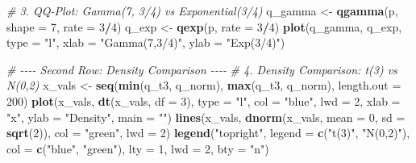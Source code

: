\documentclass[
]{article}
\newenvironment{Shaded}{\begin{snugshade}}{\end{snugshade}}
\newcommand{\AttributeTok}[1]{\textcolor[rgb]{0.13,0.29,0.53}{#1}}
\newcommand{\CommentTok}[1]{\textcolor[rgb]{0.56,0.35,0.01}{\textit{#1}}}
\newcommand{\DecValTok}[1]{\textcolor[rgb]{0.00,0.00,0.81}{#1}}
\newcommand{\FunctionTok}[1]{\textcolor[rgb]{0.13,0.29,0.53}{\textbf{#1}}}
\newcommand{\NormalTok}[1]{#1}
\newcommand{\OtherTok}[1]{\textcolor[rgb]{0.56,0.35,0.01}{#1}}
\newcommand{\SpecialCharTok}[1]{\textcolor[rgb]{0.81,0.36,0.00}{\textbf{#1}}}
\newcommand{\StringTok}[1]{\textcolor[rgb]{0.31,0.60,0.02}{#1}}
\begin{document}
\begin{Shaded}
\begin{Highlighting}[]
\CommentTok{\# 3. QQ{-}Plot: Gamma(7, 3/4) vs Exponential(3/4)}
\NormalTok{q\_gamma }\OtherTok{\textless{}{-}} \FunctionTok{qgamma}\NormalTok{(p, }\AttributeTok{shape =} \DecValTok{7}\NormalTok{, }\AttributeTok{rate =} \DecValTok{3}\SpecialCharTok{/}\DecValTok{4}\NormalTok{)}
\NormalTok{q\_exp }\OtherTok{\textless{}{-}} \FunctionTok{qexp}\NormalTok{(p, }\AttributeTok{rate =} \DecValTok{3}\SpecialCharTok{/}\DecValTok{4}\NormalTok{)}
\FunctionTok{plot}\NormalTok{(q\_gamma, q\_exp, }\AttributeTok{type =} \StringTok{"l"}\NormalTok{, }\AttributeTok{xlab =} \StringTok{"Gamma(7,3/4)"}\NormalTok{, }\AttributeTok{ylab =} \StringTok{"Exp(3/4)"}\NormalTok{)}

\CommentTok{\# {-}{-}{-}{-} Second Row: Density Comparison {-}{-}{-}{-}}
\CommentTok{\# 4. Density Comparison: t(3) vs N(0,2)}
\NormalTok{x\_vals }\OtherTok{\textless{}{-}} \FunctionTok{seq}\NormalTok{(}\FunctionTok{min}\NormalTok{(q\_t3, q\_norm), }\FunctionTok{max}\NormalTok{(q\_t3, q\_norm), }\AttributeTok{length.out =} \DecValTok{200}\NormalTok{)}
\FunctionTok{plot}\NormalTok{(x\_vals, }\FunctionTok{dt}\NormalTok{(x\_vals, }\AttributeTok{df =} \DecValTok{3}\NormalTok{), }\AttributeTok{type =} \StringTok{"l"}\NormalTok{, }\AttributeTok{col =} \StringTok{"blue"}\NormalTok{, }\AttributeTok{lwd =} \DecValTok{2}\NormalTok{, }\AttributeTok{xlab =} \StringTok{"x"}\NormalTok{, }\AttributeTok{ylab =} \StringTok{"Density"}\NormalTok{, }\AttributeTok{main =} \StringTok{""}\NormalTok{)}
\FunctionTok{lines}\NormalTok{(x\_vals, }\FunctionTok{dnorm}\NormalTok{(x\_vals, }\AttributeTok{mean =} \DecValTok{0}\NormalTok{, }\AttributeTok{sd =} \FunctionTok{sqrt}\NormalTok{(}\DecValTok{2}\NormalTok{)), }\AttributeTok{col =} \StringTok{"green"}\NormalTok{, }\AttributeTok{lwd =} \DecValTok{2}\NormalTok{)}
\FunctionTok{legend}\NormalTok{(}\StringTok{"topright"}\NormalTok{, }\AttributeTok{legend =} \FunctionTok{c}\NormalTok{(}\StringTok{"t(3)"}\NormalTok{, }\StringTok{"N(0,2)"}\NormalTok{), }\AttributeTok{col =} \FunctionTok{c}\NormalTok{(}\StringTok{"blue"}\NormalTok{, }\StringTok{"green"}\NormalTok{), }\AttributeTok{lty =} \DecValTok{1}\NormalTok{, }\AttributeTok{lwd =} \DecValTok{2}\NormalTok{, }\AttributeTok{bty =} \StringTok{"n"}\NormalTok{)}


\end{Highlighting}
\end{Shaded}
\end{document}
